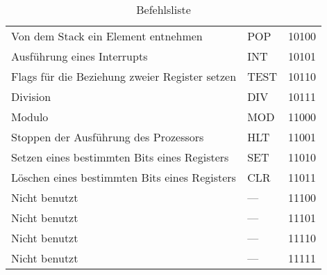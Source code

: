 \begin{table}[h]
\begin{tabular}{lll}
Von dem Stack ein Element entnehmen				& POP   	& 10100\\
Ausführung eines Interrupts						& INT   	& 10101\\
Flags für die Beziehung zweier Register setzen	& TEST  	& 10110\\
Division										& DIV   	& 10111\\
Modulo											& MOD   	& 11000\\
Stoppen der Ausführung des Prozessors			& HLT   	& 11001\\
Setzen eines bestimmten Bits eines Registers	& SET   	& 11010\\
Löschen eines bestimmten Bits eines Registers	& CLR   	& 11011\\
Nicht benutzt									& ---   	& 11100\\
Nicht benutzt									& ---   	& 11101\\
Nicht benutzt									& ---   	& 11110\\
Nicht benutzt									& ---   	& 11111\\
\bottomrule
\end{tabular}
\caption{Befehlsliste}
\label{tab:befehlsliste}
\end{table}

